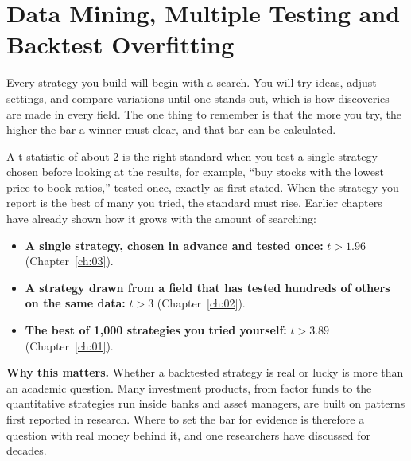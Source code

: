\makeatletter
{}
\makeatother

\chapter{Data Mining, Multiple Testing and Backtest Overfitting}
\label{ch:04}

Every strategy you build will begin with a search. You will try ideas, adjust
settings, and compare variations until one stands out, which is how
discoveries are made in every field. The one thing to remember is that the
more you try, the higher the bar a winner must clear, and that bar can be
calculated.

A t-statistic of about 2 is the right standard when you test a single strategy
chosen before looking at the results, for example, ``buy stocks with the
lowest price-to-book ratios,'' tested once, exactly as first stated. When the
strategy you report is the best of many you tried, the standard must rise.
Earlier chapters have already shown how it grows with the amount of searching:

\begin{itemize}
  \item \textbf{A single strategy, chosen in advance and tested once:} $t > 1.96$ (Chapter~\ref{ch:03}).
  \item \textbf{A strategy drawn from a field that has tested hundreds of others on the same data:} $t > 3$ (Chapter~\ref{ch:02}).
  \item \textbf{The best of 1,000 strategies you tried yourself:} $t > 3.89$ (Chapter~\ref{ch:01}).
\end{itemize}

\textbf{Why this matters.} Whether a backtested strategy is real or lucky is
more than an academic question. Many investment products, from factor funds to
the quantitative strategies run inside banks and asset managers, are built on
patterns first reported in research. Where to set the bar for evidence is therefore a
question with real money behind it, and one researchers have discussed for
decades.

